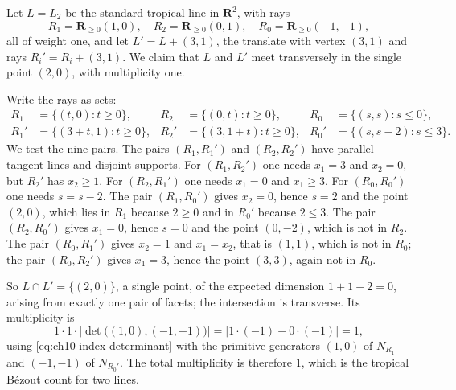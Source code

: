 \begin{example}
\label{ex:ch10-two-lines-generic}
Let $L=L_2$ be the standard tropical line in $\mathbf R^2$, with rays
\[
 R_1=\mathbf R_{\geq0}(1,0),\quad
 R_2=\mathbf R_{\geq0}(0,1),\quad
 R_0=\mathbf R_{\geq0}(-1,-1),
\]
all of weight one, and let $L'=L+(3,1)$, the translate with vertex $(3,1)$
and rays $R_i'=R_i+(3,1)$.  We claim that $L$ and $L'$ meet transversely in
the single point $(2,0)$, with multiplicity one.

Write the rays as sets:
\[
\begin{aligned}
 R_1&=\{(t,0):t\geq0\}, & R_2&=\{(0,t):t\geq0\}, &
 R_0&=\{(s,s):s\leq0\},\\
 R_1'&=\{(3+t,1):t\geq0\}, & R_2'&=\{(3,1+t):t\geq0\}, &
 R_0'&=\{(s,s-2):s\leq3\}.
\end{aligned}
\]
We test the nine pairs.  The pairs $(R_1,R_1')$ and $(R_2,R_2')$ have
parallel tangent lines and disjoint supports.  For $(R_1,R_2')$ one needs
$x_1=3$ and $x_2=0$, but $R_2'$ has $x_2\geq1$.  For $(R_2,R_1')$ one needs
$x_1=0$ and $x_1\geq3$.  For $(R_0,R_0')$ one needs $s=s-2$.  The pair
$(R_1,R_0')$ gives $x_2=0$, hence $s=2$ and the point $(2,0)$, which lies in
$R_1$ because $2\geq0$ and in $R_0'$ because $2\leq3$.  The pair
$(R_2,R_0')$ gives $x_1=0$, hence $s=0$ and the point $(0,-2)$, which is not
in $R_2$.  The pair $(R_0,R_1')$ gives $x_2=1$ and $x_1=x_2$, that is
$(1,1)$, which is not in $R_0$; the pair $(R_0,R_2')$ gives $x_1=3$, hence
the point $(3,3)$, again not in $R_0$.

So $L\cap L'=\{(2,0)\}$, a single point, of the expected dimension
$1+1-2=0$, arising from exactly one pair of facets; the intersection is
transverse.  Its multiplicity is
\[
 1\cdot1\cdot\bigl|\det\bigl((1,0),(-1,-1)\bigr)\bigr|
 =\bigl|1\cdot(-1)-0\cdot(-1)\bigr|=1,
\]
using \eqref{eq:ch10-index-determinant} with the primitive generators
$(1,0)$ of $N_{R_1}$ and $(-1,-1)$ of $N_{R_0'}$.  The total multiplicity is
therefore $1$, which is the tropical Bézout count for two lines.
\end{example}

